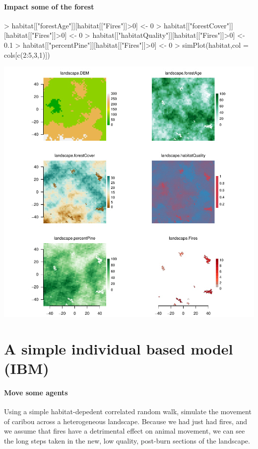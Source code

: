 \documentclass{article}
\begin{document}
\paragraph{Impact some of the forest}
\begin{Schunk}
\begin{Sinput}
> habitat[["forestAge"]][habitat[["Fires"]]>0] <- 0
> habitat[["forestCover"]][habitat[["Fires"]]>0] <- 0
> habitat[["habitatQuality"]][habitat[["Fires"]]>0] <- 0.1
> habitat[["percentPine"]][habitat[["Fires"]]>0] <- 0
> simPlot(habitat,col = cols[c(2:5,3,1)])
\end{Sinput}
\end{Schunk}
\includegraphics{introduction-fire-impacts-maps}

\section{A simple individual based model (IBM)}
\paragraph{Move some agents}
Using a simple habitat-depedent correlated random walk, simulate the movement of caribou across a heterogeneous landscape. Because we had just had fires, and we assume that fires have a detrimental effect on animal movement, we can see the long steps taken in the new, low quality, post-burn sections of the landscape.
\end{document}
